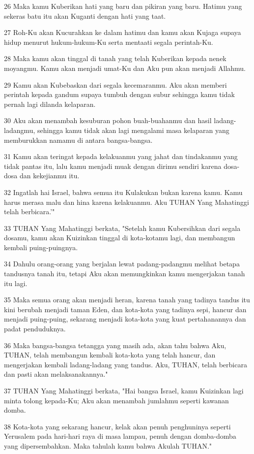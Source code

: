 \par 26 Maka kamu Kuberikan hati yang baru dan pikiran yang baru. Hatimu yang sekeras batu itu akan Kuganti dengan hati yang taat.
\par 27 Roh-Ku akan Kucurahkan ke dalam hatimu dan kamu akan Kujaga supaya hidup menurut hukum-hukum-Ku serta mentaati segala perintah-Ku.
\par 28 Maka kamu akan tinggal di tanah yang telah Kuberikan kepada nenek moyangmu. Kamu akan menjadi umat-Ku dan Aku pun akan menjadi Allahmu.
\par 29 Kamu akan Kubebaskan dari segala kecemaranmu. Aku akan memberi perintah kepada gandum supaya tumbuh dengan subur sehingga kamu tidak pernah lagi dilanda kelaparan.
\par 30 Aku akan menambah kesuburan pohon buah-buahanmu dan hasil ladang-ladangmu, sehingga kamu tidak akan lagi mengalami masa kelaparan yang memburukkan namamu di antara bangsa-bangsa.
\par 31 Kamu akan teringat kepada kelakuanmu yang jahat dan tindakanmu yang tidak pantas itu, lalu kamu menjadi muak dengan dirimu sendiri karena dosa-dosa dan kekejianmu itu.
\par 32 Ingatlah hai Israel, bahwa semua itu Kulakukan bukan karena kamu. Kamu harus merasa malu dan hina karena kelakuanmu. Aku TUHAN Yang Mahatinggi telah berbicara.'"
\par 33 TUHAN Yang Mahatinggi berkata, "Setelah kamu Kubersihkan dari segala dosamu, kamu akan Kuizinkan tinggal di kota-kotamu lagi, dan membangun kembali puing-puingnya.
\par 34 Dahulu orang-orang yang berjalan lewat padang-padangmu melihat betapa tandusnya tanah itu, tetapi Aku akan memungkinkan kamu mengerjakan tanah itu lagi.
\par 35 Maka semua orang akan menjadi heran, karena tanah yang tadinya tandus itu kini berubah menjadi taman Eden, dan kota-kota yang tadinya sepi, hancur dan menjadi puing-puing, sekarang menjadi kota-kota yang kuat pertahanannya dan padat penduduknya.
\par 36 Maka bangsa-bangsa tetangga yang masih ada, akan tahu bahwa Aku, TUHAN, telah membangun kembali kota-kota yang telah hancur, dan mengerjakan kembali ladang-ladang yang tandus. Aku, TUHAN, telah berbicara dan pasti akan melaksanakannya."
\par 37 TUHAN Yang Mahatinggi berkata, "Hai bangsa Israel, kamu Kuizinkan lagi minta tolong kepada-Ku; Aku akan menambah jumlahmu seperti kawanan domba.
\par 38 Kota-kota yang sekarang hancur, kelak akan penuh penghuninya seperti Yerusalem pada hari-hari raya di masa lampau, penuh dengan domba-domba yang dipersembahkan. Maka tahulah kamu bahwa Akulah TUHAN."

